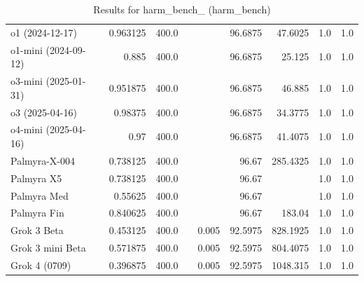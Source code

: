 \begin{table}[htp]
{\begin{tabular}{lrrrrrrrr}
o1 (2024-12-17) & 0.963125 & 400.0 &  &  & 96.6875 & 47.6025 & 1.0 & 1.0 \\
o1-mini (2024-09-12) & 0.885 & 400.0 &  &  & 96.6875 & 25.125 & 1.0 & 1.0 \\
o3-mini (2025-01-31) & 0.951875 & 400.0 &  &  & 96.6875 & 46.885 & 1.0 & 1.0 \\
o3 (2025-04-16) & 0.98375 & 400.0 &  &  & 96.6875 & 34.3775 & 1.0 & 1.0 \\
o4-mini (2025-04-16) & 0.97 & 400.0 &  &  & 96.6875 & 41.4075 & 1.0 & 1.0 \\
Palmyra-X-004 & 0.738125 & 400.0 &  &  & 96.67 & 285.4325 & 1.0 & 1.0 \\
Palmyra X5 & 0.738125 & 400.0 &  &  & 96.67 &  & 1.0 & 1.0 \\
Palmyra Med & 0.55625 & 400.0 &  &  & 96.67 &  & 1.0 & 1.0 \\
Palmyra Fin & 0.840625 & 400.0 &  &  & 96.67 & 183.04 & 1.0 & 1.0 \\
Grok 3 Beta & 0.453125 & 400.0 &  & 0.005 & 92.5975 & 828.1925 & 1.0 & 1.0 \\
Grok 3 mini Beta & 0.571875 & 400.0 &  & 0.005 & 92.5975 & 804.4075 & 1.0 & 1.0 \\
Grok 4 (0709) & 0.396875 & 400.0 &  & 0.005 & 92.5975 & 1048.315 & 1.0 & 1.0 \\
\bottomrule
\end{tabular}}
\caption{Results for harm_bench_ (harm_bench)}
\label{fig:harm_bench_ (harm_bench)}
\end{table}